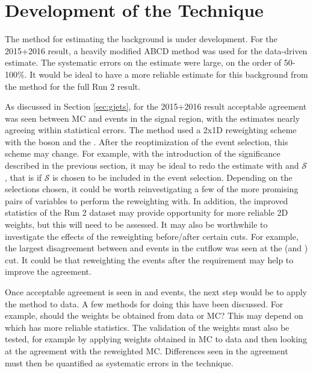 \section{Development of the \gjets Technique}

The \gjets method for estimating the \Zjets background is under development. For the 2015+2016 result, a heavily modified ABCD method was used for the \Zjets data-driven estimate. The systematic errors on the estimate were large, on the order of 50-100\%. It would be ideal to have a more reliable estimate for this background from the \gjets method for the full Run 2 result.

As discussed in Section \ref{sec:gjets}, for the 2015+2016 result acceptable agreement was seen between MC \gjets and \Zjets events in the signal region, with the estimates nearly agreeing within statistical errors. The method used a 2x1D reweighting scheme with the boson \pt and the \etmissht. After the reoptimization of the event selection, this scheme may change. For example, with the introduction of the \etmiss significance described in the previous section, it may be ideal to redo the \gjets estimate with \pt and $\mathcal{S}$, that is if $\mathcal{S}$ is chosen to be included in the event selection. Depending on the selections chosen, it could be worth reinvestigating a few of the more promising pairs of variables to perform the reweighting with. In addition, the improved statistics of the Run 2 dataset may provide opportunity for more reliable 2D weights, but this will need to be assessed. It may also be worthwhile to investigate the effects of the reweighting before/after certain cuts. For example, the largest disagreement between \gjets and \Zjets events in the cutflow was seen at the \etmiss (and \etmissht) cut. It could be that reweighting the events after the \etmiss requirement may help to improve the agreement.

Once acceptable agreement is seen in \gjets and \Zjets events, the next step would be to apply the method to data. A few methods for doing this have been discussed. For example, should the weights be obtained from data or MC? This may depend on which has more reliable statistics. The validation of the weights must also be tested, for example by applying weights obtained in MC to data and then looking at the agreement with the reweighted MC. Differences seen in the agreement must then be quantified as systematic errors in the technique. 

